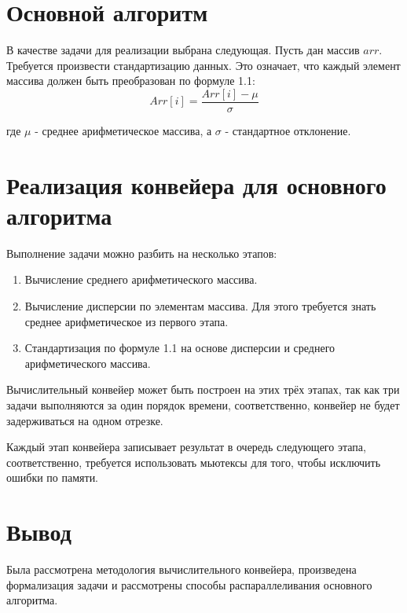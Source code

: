 \section{Основной алгоритм}
В качестве задачи для реализации выбрана следующая.
Пусть дан массив $ arr $. 
Требуется произвести стандартизацию данных.
Это означает, что каждый элемент массива должен быть преобразован по формуле 1.1:
\begin{equation}
{Arr}[i] = \frac{{Arr}[i] - \mu}{\sigma}
\end{equation}

где $\mu$ - среднее арифметическое массива, а $\sigma$ - стандартное отклонение.

\section{Реализация конвейера для основного алгоритма}
Выполнение задачи можно разбить на несколько этапов:
\begin{enumerate}
	\item Вычисление среднего арифметического массива.
	\item Вычисление дисперсии по элементам массива. Для этого требуется знать среднее арифметическое из первого этапа.
	\item Стандартизация по формуле 1.1 на основе дисперсии и среднего арифметического массива.
\end{enumerate}

Вычислительный конвейер может быть построен на этих трёх этапах, так как три задачи выполняются за один порядок времени, соответственно, конвейер не будет задерживаться на одном отрезке.

Каждый этап конвейера записывает результат в очередь следующего этапа, соответственно, требуется использовать мьютексы для того, чтобы исключить ошибки по памяти.

\section{Вывод}
Была рассмотрена методология вычислительного конвейера, произведена формализация задачи и рассмотрены способы распараллеливания основного алгоритма.